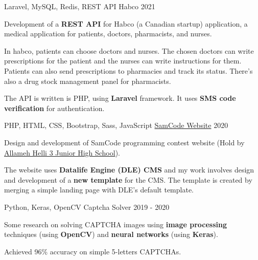 

\begin{cventries}

  \cventry
    {Laravel, MySQL, Redis, REST API} %
    {Habco} %
    {} %
    {2021} %
    {
      \begin{cvitems} %
      	\item {Development of a \textbf{REST API} for Habco (a Canadian startup) application, a medical application for patients, doctors, pharmacists, and nurses.}
      	\item {In habco, patients can choose doctors and nurses. The chosen doctors can write prescriptions for the patient and the nurses can write instructions for them. Patients can also send prescriptions to pharmacies and track its status. There's also a drug stock management panel for pharmacists.}
      	\item {The API is written is PHP, using \textbf{Laravel} framework. It uses \textbf{SMS code verification} for authentication.}
      \end{cvitems}
    }

  \cventry
    {PHP, HTML, CSS, Bootstrap, Sass, JavaScript} %
    {\href{https://samcode.allamehelli3.ir/}{SamCode Website}} %
    {} %
    {2020} %
    {
      \begin{cvitems} %
      	\item {Design and development of SamCode programming contest website (Hold by \href{http://helli3school.ir}{Allameh Helli 3 Junior High School}).}
      	\item {The website uses \textbf{Datalife Engine (DLE) CMS} and my work involves design and development of a \textbf{new template} for the CMS. The template is created by merging a simple landing page with DLE's default template.}
      \end{cvitems}
    }

  \cventry
    {Python, Keras, OpenCV} %
    {Captcha Solver} %
    {} %
    {2019 - 2020} %
    {
      \begin{cvitems} %
      	\item {Some research on solving CAPTCHA images using \textbf{image processing} techniques (using \textbf{OpenCV}) and \textbf{neural networks} (using \textbf{Keras}).}
      	\item {Achieved 96\% accuracy on simple 5-letters CAPTCHAs.}
      \end{cvitems}
    }


\end{cventries}
